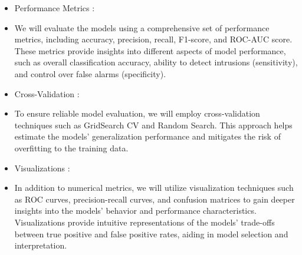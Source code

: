 \documentclass[11pt]{article}
\theoremstyle{definition}
\theoremstyle{theorem}
\newcommand{\response}{\medskip\noindent{\color{DarkBlue}\textbf{Response:}}}
\begin{document}
\begin{enumerate}
\response

\begin{itemize}

	\item Performance Metrics : 
	\item [] We will evaluate the models using a comprehensive set of performance metrics, including accuracy, precision, recall, F1-score, and ROC-AUC score. These metrics provide insights into different aspects of model performance, such as overall classification accuracy, ability to detect intrusions (sensitivity), and control over false alarms (specificity).
	
	\item Cross-Validation :
	\item [] To ensure reliable model evaluation, we will employ cross-validation techniques such as GridSearch CV and Random Search. This approach helps estimate the models' generalization performance and mitigates the risk of overfitting to the training data.
	
	\item Visualizations :
	\item [] In addition to numerical metrics, we will utilize visualization techniques such as ROC curves, precision-recall curves, and confusion matrices to gain deeper insights into the models' behavior and performance characteristics. Visualizations provide intuitive representations of the models' trade-offs between true positive and false positive rates, aiding in model selection and interpretation.
\end{itemize}


\end{enumerate}
\end{document}
